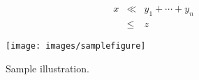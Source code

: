 \documentclass[review]{acmsiggraph}
\begin{document}
\begin{eqnarray}
x & \ll & y_{1} + \cdots + y_{n} \\
  & \leq & z
\end{eqnarray}


\begin{figure}[ht]
  \centering
  \texttt{[image: images/samplefigure]}
  \caption{Sample illustration.}
\end{figure}
\fi





\end{document}
